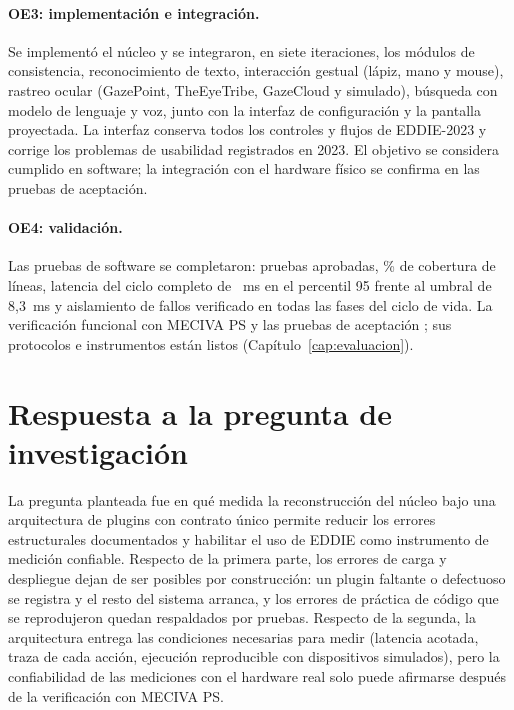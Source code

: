 \paragraph{OE3: implementación e integración.} Se implementó el núcleo y se integraron, en siete iteraciones, los módulos de consistencia, reconocimiento de texto, interacción gestual (lápiz, mano y mouse), rastreo ocular (GazePoint, TheEyeTribe, GazeCloud y simulado), búsqueda con modelo de lenguaje y voz, junto con la interfaz de configuración y la pantalla proyectada. La interfaz conserva todos los controles y flujos de EDDIE-2023 y corrige los problemas de usabilidad registrados en 2023. El objetivo se considera cumplido en software; la integración con el hardware físico se confirma en las pruebas de aceptación.

\paragraph{OE4: validación.} Las pruebas de software se completaron: \PSietePruebas{} pruebas aprobadas, \PSieteCobertura\% de cobertura de líneas, latencia del ciclo completo de \PSieteCicloPnoventaycinco~ms en el percentil 95 frente al umbral de 8,3~ms y aislamiento de fallos verificado en todas las fases del ciclo de vida. La verificación funcional con MECIVA PS y las pruebas de aceptación ; sus protocolos e instrumentos están listos (Capítulo~\ref{cap:evaluacion}).

\section{Respuesta a la pregunta de investigación}

La pregunta planteada fue en qué medida la reconstrucción del núcleo bajo una arquitectura de plugins con contrato único permite reducir los errores estructurales documentados y habilitar el uso de EDDIE como instrumento de medición confiable. Respecto de la primera parte, los errores de carga y despliegue dejan de ser posibles por construcción: un plugin faltante o defectuoso se registra y el resto del sistema arranca, y los errores de práctica de código que se reprodujeron quedan respaldados por pruebas. Respecto de la segunda, la arquitectura entrega las condiciones necesarias para medir (latencia acotada, traza de cada acción, ejecución reproducible con dispositivos simulados), pero la confiabilidad de las mediciones con el hardware real solo puede afirmarse después de la verificación con MECIVA PS.

